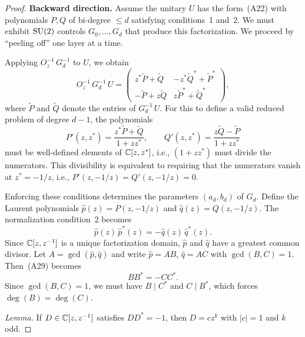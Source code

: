 \begin{proof}
	\medskip
	\noindent\textbf{Backward direction.}\quad
	Assume the unitary $U$ has the form~(A22) with
	polynomials $P, Q$ of bi-degree $\leq d$ satisfying
	conditions~1 and~2.  We must exhibit $\mathrm{SU}(2)$ controls
	$G_0, \ldots, G_d$ that produce this factorization.
	We proceed by ``peeling off'' one layer at a time.

	Applying $O_z^{-1}\,G_d^{-1}$ to $U$, we obtain
	\begin{equation}
		O_z^{-1}\,G_d^{-1}\,U
		= \begin{pmatrix}
			z^*\widetilde{P} + \widetilde{Q}   &
			-z^*\widetilde{Q}^* + \widetilde{P}^*   \\
			-\widetilde{P} + z\widetilde{Q}     &
			z\widetilde{P}^* + \widetilde{Q}^*
		\end{pmatrix},
		\tag{A27}
	\end{equation}
	where $\widetilde{P}$ and $\widetilde{Q}$ denote the
	entries of $G_d^{-1}\,U$.
	For this to define a valid reduced problem of degree
	$d - 1$, the polynomials
	\begin{equation}
		P'(z,z^*) = \frac{z^*\widetilde{P} + \widetilde{Q}}{1+zz^*},
		\qquad
		Q'(z,z^*) = \frac{z\widetilde{Q} - \widetilde{P}}{1+zz^*}
		\tag{A28}
	\end{equation}
	must be well-defined elements of $\mathbb{C}[z, z^*]$, i.e.,
	$(1+zz^*)$ must divide the numerators.  This
	divisibility is equivalent to requiring that the
	numerators vanish at $z^* = -1/z$, i.e.,
	$P'(z, -1/z) = Q'(z, -1/z) = 0$.

	Enforcing these conditions determines the parameters
	$(a_d, b_d)$ of $G_d$.  Define the Laurent polynomials
	$\hat{p}(z) = P(z, -1/z)$ and
	$\hat{q}(z) = Q(z, -1/z)$.  The normalization
	condition~2 becomes
	\begin{equation}
		\hat{p}(z)\,\hat{p}^*(z) = -\hat{q}(z)\,\hat{q}^*(z).
		\tag{A29}
	\end{equation}
	Since $\mathbb{C}[z, z^{-1}]$ is a unique factorization domain,
	$\hat{p}$ and $\hat{q}$ have a greatest common divisor.
	Let $A = \gcd(\hat{p}, \hat{q})$ and write
	$\hat{p} = AB$, $\hat{q} = AC$ with
	$\gcd(B, C) = 1$.  Then~(A29) becomes
	\begin{equation}
		BB^* = -CC^*.
		\tag{A30}
	\end{equation}
	Since $\gcd(B, C) = 1$, we must have $B \mid C^*$ and
	$C \mid B^*$, which forces $\deg(B) = \deg(C)$.

	\textit{Lemma.}
		If $D \in \mathbb{C}[z, z^{-1}]$ satisfies $DD^* = -1$,
		then $D = cz^k$ with $|c| = 1$ and $k$ odd.


\end{proof}

